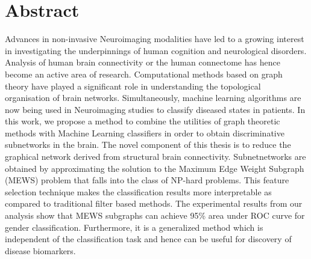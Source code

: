 \documentclass[msthesis.tex]{subfiles}
\begin{document}
\chapter{Abstract}
\thispagestyle{empty}

Advances in non-invasive Neuroimaging modalities have led to a growing interest in investigating the underpinnings of human cognition and neurological disorders. Analysis of human brain connectivity or the human connectome has hence become an active area of research. Computational methods based on graph theory have played a significant role in understanding the topological organisation of brain networks. Simultaneously, machine learning algorithms are now being used in Neuroimaging studies to classify diseased states in patients. In this work, we propose a method to combine the utilities of graph theoretic methods with Machine Learning classifiers in order to obtain discriminative subnetworks in the brain. The novel component of this thesis is to reduce the graphical network derived from structural brain connectivity. Subnetnetworks are obtained by approximating the solution to the Maximum Edge Weight Subgraph (MEWS) problem that falls into the class of NP-hard problems. This feature selection technique makes the classification results more interpretable as compared to traditional filter based methods. The experimental results from our analysis show that MEWS subgraphs can achieve 95\% area under ROC curve for gender classification. Furthermore, it is a generalized method which is independent of the classification task and hence can be useful for discovery of disease biomarkers.
\end{document}
